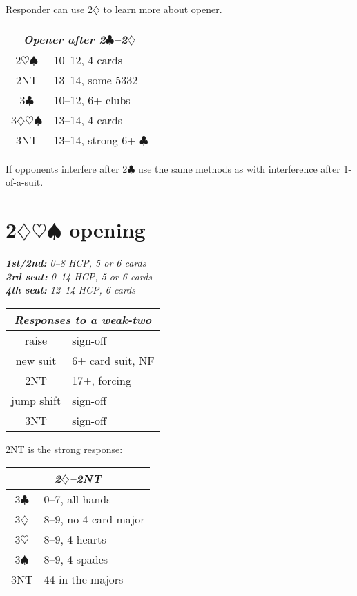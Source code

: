 \documentclass[a4paper, twoside, 11pt]{article}
\begin{document}
\begin{multicols}{3}
Responder can use 2$\diamondsuit$ to learn more about opener.
\begin{center}
\begin{tabular}{ |c|l| }
 \hline
 \multicolumn{2}{|c|}{\textit{Opener after 2$\clubsuit$--2$\diamondsuit$}} \\
 \hline
 2$\heartsuit\spadesuit$ & 10--12, 4 cards\\
 2NT &  13--14, some 5332 \\
3$\clubsuit$ & 10--12, 6+ clubs\\
 3$\diamondsuit\heartsuit\spadesuit$ & 13--14, 4 cards \\
 3NT & 13--14, strong 6+ $\clubsuit$ \\
 \hline
\end{tabular}
\end{center}

If opponents interfere after 2$\clubsuit$ use the same methods as with interference after 1-of-a-suit.

\section{2$\diamondsuit\heartsuit\spadesuit$ opening}

\emph{\textbf{1st/2nd:} 0--8 HCP, 5 or 6 cards \\ \textbf{3rd seat:} 0--14 HCP, 5 or 6 cards \\ \textbf{4th seat:} 12--14 HCP, 6 cards}

\begin{center}
\begin{tabular}{ |c|l| }
 \hline
 \multicolumn{2}{|c|}{\textit{Responses to a weak-two}} \\
 \hline
 raise & sign-off\\
 new suit & 6+ card suit, NF  \\
2NT & 17+, forcing \\
 jump shift & sign-off \\
 3NT & sign-off \\
 \hline
\end{tabular}
\end{center}

2NT is the strong response:
\begin{center}
\begin{tabular}{ |c|l| }
 \hline
 \multicolumn{2}{|c|}{\textit{2$\diamondsuit$--2NT}} \\
 \hline
3$\clubsuit$ & 0--7, all hands\\
3$\diamondsuit$ & 8--9, no 4 card major \\
3$\heartsuit$ & 8--9, 4 hearts \\
3$\spadesuit$ & 8--9, 4 spades \\
 3NT & 44 in the majors \\
 \hline
\end{tabular}
\end{center}


\end{multicols}
\end{document}

